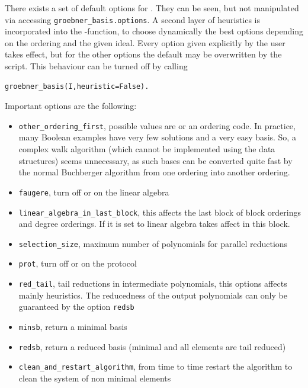There exists a set of default options for .
They can be seen, but not manipulated via accessing \lstinline|groebner_basis.options|.
A second layer of heuristics is incorporated into the -function, to choose dynamically the best options depending on the ordering and the given ideal.
Every option given explicitly by the user takes effect, but for the other options the default may be overwritten by the script.
This behaviour can be turned off by calling
\begin{lstlisting}
groebner_basis(I,heuristic=False).
\end{lstlisting}

Important options are the following:
\begin{itemize}
    \item \lstinline|other_ordering_first|, possible values are  or an ordering code.
    In practice, many Boolean examples have very few solutions and a very easy \Groebner basis. So, a complex walk algorithm (which cannot be implemented using the \PolyBoRi data structures) seems unnecessary, as such \Groebner bases can be converted quite fast by the 
    normal Buchberger algorithm from one ordering into another ordering.
    \item \lstinline|faugere|, turn off or on the linear algebra
    \item \lstinline|linear_algebra_in_last_block|, this affects the last block of block orderings and degree orderings. If it is set to  linear algebra takes affect in this block.
    \item \lstinline|selection_size|, maximum number of polynomials for parallel reductions
    \item \lstinline|prot|, turn off or on the protocol
    \item \lstinline|red_tail|, tail reductions in intermediate polynomials, this options affects mainly heuristics. The reducedness of the output polynomials can only be guaranteed by the option \lstinline|redsb|
    \item \lstinline|minsb|, return a minimal \Groebner basis
    \item \lstinline|redsb|, return a reduced \Groebner basis (minimal and all elements are tail reduced)
    \item \lstinline|clean_and_restart_algorithm|, from time to time restart the algorithm to clean the system of non minimal elements
\end{itemize}

